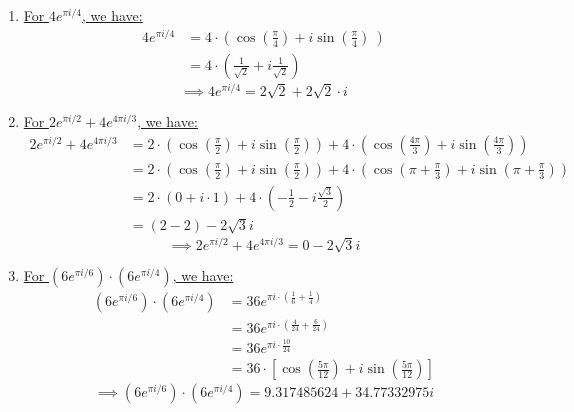 \documentclass{article}
\begin{document}
  \begin{enumerate}[label=(\alph*)]
    \item \underline{For $4 e^{\pi i / 4}$, we have:}
    \begin{align*}
      4 e^{\pi i / 4} &= 4 \cdot \left( \cos\left( \frac{\pi}{4} \right) + i\sin\left( \frac{\pi}{4} \right) \ \right) \\
      &= 4 \cdot \left( \frac{1}{\sqrt{2}} + i\frac{1}{\sqrt{2}} \right) 
    \end{align*}
    \[ \boxed{\implies 4 e^{\pi i / 4} = 2\sqrt{2} + 2\sqrt{2} \cdot i} \]
    
    \vskip 0.5cm
    \item \underline{For $2 e^{\pi i / 2} + 4 e^{4 \pi i / 3}$, we have:}
    \begin{align*}
      2 e^{\pi i / 2} + 4 e^{4 \pi i / 3} &= 2 \cdot \left( \cos\left( \frac{\pi}{2} \right) + i\sin\left( \frac{\pi}{2} \right) \right) + 4 \cdot \left( \cos\left( \frac{4\pi}{3} \right) + i\sin\left( \frac{4\pi}{3} \right) \right) \\ 
      &= 2 \cdot \left( \cos\left( \frac{\pi}{2} \right) + i\sin\left( \frac{\pi}{2} \right) \right) + 4 \cdot \left( \cos\left( \pi + \frac{\pi}{3} \right) + i\sin\left( \pi + \frac{\pi}{3} \right) \right) \\ 
      &= 2 \cdot \left( 0 + i \cdot 1 \right) + 4 \cdot \left( -\frac{1}{2} - i\frac{\sqrt{3}}{2} \right) \\
      &= (2 - 2) - 2\sqrt{3} i 
    \end{align*}
    \[ \boxed{\implies 2 e^{\pi i / 2} + 4 e^{4 \pi i / 3} = 0 - 2\sqrt{3} i} \]


    \vskip 0.5cm
    \item \underline{For $(6 e^{\pi i / 6}) \cdot (6 e^{\pi i / 4})$, we have:}
    \begin{align*}
      (6 e^{\pi i / 6}) \cdot (6 e^{\pi i / 4}) &= 36e^{\pi i \cdot \left(\frac{1}{6} + \frac{1}{4}\right)} \\
      &= 36e^{\pi i \cdot \left(\frac{4}{24} + \frac{6}{24}\right)} \\
      &= 36e^{\pi i \cdot \frac{10}{24}} \\
      &= 36 \cdot \left[ \cos\left( \frac{5\pi}{12} \right) + i \sin\left(\frac{5\pi}{12}  \right)\right] 
    \end{align*}
    \[ \boxed{\implies (6 e^{\pi i / 6}) \cdot (6 e^{\pi i / 4}) = 9.317485624 + 34.77332975i} \]

  \end{enumerate}
\end{document}
